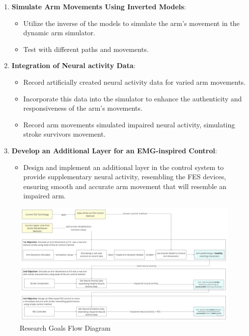 \begin{enumerate}
    \item \textbf{Simulate Arm Movements Using Inverted Models}:
    \begin{itemize}
        \item Utilize the inverse of the models to simulate the arm's movement in the dynamic arm simulator.
        \item Test with different paths and movements.
    \end{itemize}
    
    \item \textbf{Integration of Neural activity Data}:
    \begin{itemize}
        \item Record artificially created neural activity data for varied arm movements.
        \item Incorporate this data into the simulator to enhance the authenticity and responsiveness of the arm's movements.
        \item Record arm movements simulated impaired neural activity, simulating stroke survivors movement.
    \end{itemize}
    
    \item \textbf{Develop an Additional Layer for an EMG-inspired Control}:
    \begin{itemize}
        \item Design and implement an additional layer in the control system to provide supplementary neural activity, resembling the FES devices, ensuring smooth and accurate arm movement that will resemble an impaired arm.
    \end{itemize}
\end{enumerate}


\begin{figure}[h!]
    \centering
    \includegraphics[width=\textwidth]{Pictures/ResearchGoals.jpg}
    \caption{Research Goals Flow Diagram }
    \label{fig:researchgoals}
\end{figure}



